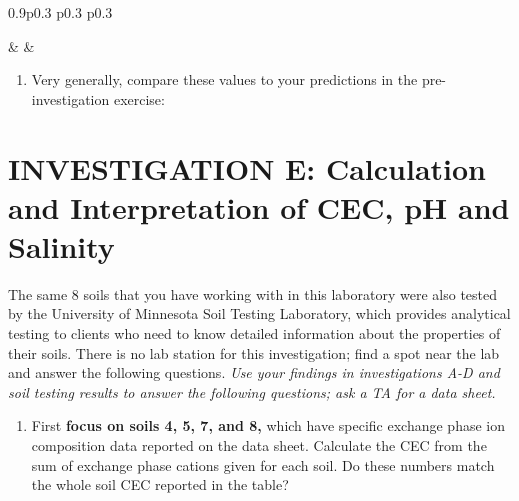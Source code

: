 \documentclass[
  letterpaper,
  twocolumn,
  portrait]{scrbook}
\providecommand{\tightlist}{%
  \setlength{\itemsep}{0pt}\setlength{\parskip}{0pt}}\usepackage{longtable,booktabs,array}
\begin{document}
\begin{table}[h!]
\begin{centerbox}
\begin{threeparttable}
\begin{tabularx}{0.9\textwidth}{p{} p{} p{}}

 &
 &
 \tabularnewline[-0.5pt]


\end{tabularx}
\end{threeparttable}\par\end{centerbox}

\end{table}
 

\begin{enumerate}
\def\labelenumi{\arabic{enumi}.}
\setcounter{enumi}{5}
\tightlist
\item
  Very generally, compare these values to your predictions in the
  pre-investigation exercise:
\end{enumerate}

\hypertarget{investigation-e-calculation-and-interpretation-of-cec-ph-and-salinity}{%
\section{INVESTIGATION E: Calculation and Interpretation of CEC, pH and
Salinity}\label{investigation-e-calculation-and-interpretation-of-cec-ph-and-salinity}}

The same 8 soils that you have working with in this laboratory were also
tested by the University of Minnesota Soil Testing Laboratory, which
provides analytical testing to clients who need to know detailed
information about the properties of their soils. There is no lab station
for this investigation; find a spot near the lab and answer the
following questions. \emph{Use your findings in investigations A-D and
soil testing results to answer the following questions; ask a TA for a
data sheet.}

\begin{enumerate}
\def\labelenumi{\arabic{enumi}.}
\tightlist
\item
  First \textbf{focus on soils 4, 5, 7, and 8,} which have specific
  exchange phase ion composition data reported on the data sheet.
  Calculate the CEC from the sum of exchange phase cations given for
  each soil. Do these numbers match the whole soil CEC reported in the
  table?
\end{enumerate}
\end{document}
